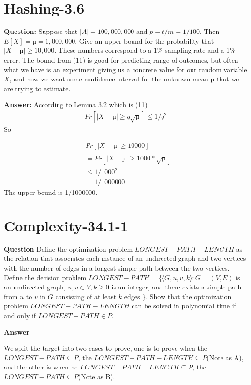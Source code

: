 \documentclass[12pt]{article}
\begin{document}
\section{Hashing-3.6}
\textbf{Question:}
Suppose that $|A| = 100,000,000$ and $p = t/m = 1/100$. Then $E[X] = µ = 1,000,000$. Give an upper bound for the probability that $|X - µ| \geq 10,000$. These numbers correspond to a 1\% sampling rate and a 1\% error. 
The bound from (11) is good for predicting range of outcomes, but often what we have is an experiment giving us a concrete value for our random variable $X$, and now we want some confidence interval for the unknown mean $µ$ that we are trying to estimate.

\textbf{Answer:}
According to Lemma 3.2 which is (11)
\begin{align}
    Pr[|X - µ| \geq q\sqrt{µ}] \leq 1 / q^2
\end{align}
So 

\begin{equation}
\begin{aligned}
    &Pr[|X - µ| \geq 10000]\\
    &=  Pr[|X - µ| \geq 1000 *\sqrt{µ}]\\
    & \leq 1/1000^2\\
    &= 1/1000000
\end{aligned}
\end{equation}
The upper bound is 1/1000000.

\section{Complexity-34.1-1}
\textbf{Question}
Define the optimization problem $LONGEST-PATH-LENGTH$ as the relation that associates each instance of an undirected graph and two vertices with the number of edges in a longest simple path between the two vertices. Define the decision problem $LONGEST-PATH= \{\langle G, u, v, k\rangle: G = (V, E)$ is an undirected graph, $u, v \in V, k \ge 0$ is an integer, and there exists a simple path from $u$ to $v$ in $G$ consisting of at least $k$ edges $\}$. Show that the optimization problem $LONGEST-PATH-LENGTH$ can be solved in polynomial time if and only if $LONGEST-PATH \in P$.

\textbf{Answer}

We split the target into two cases to prove, one is to prove when the $LONGEST-PATH \subseteq P$, the $LONGEST-PATH-LENGTH \subseteq P$(Note as A), and the other is when he $LONGEST-PATH-LENGTH \subseteq P$, the $LONGEST-PATH \subseteq P$(Note as B).
 
\end{document}
